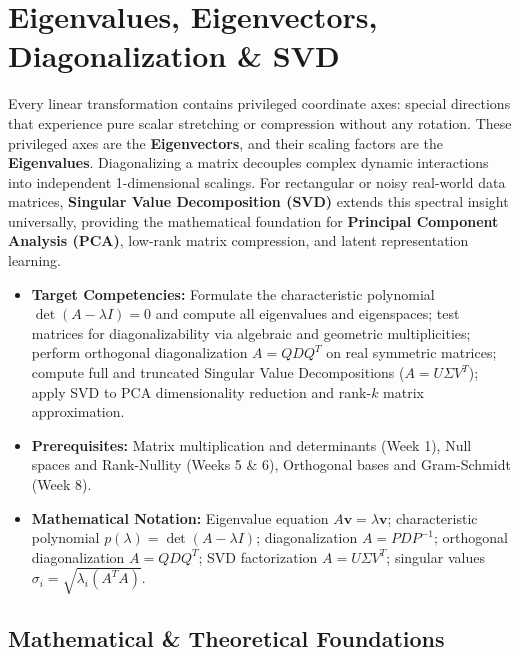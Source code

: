 \chapter{Eigenvalues, Eigenvectors, Diagonalization \& SVD}

Every linear transformation contains privileged coordinate axes: special directions that experience pure scalar stretching or compression without any rotation. These privileged axes are the \textbf{Eigenvectors}, and their scaling factors are the \textbf{Eigenvalues}. Diagonalizing a matrix decouples complex dynamic interactions into independent 1-dimensional scalings. For rectangular or noisy real-world data matrices, \textbf{Singular Value Decomposition (SVD)} extends this spectral insight universally, providing the mathematical foundation for \textbf{Principal Component Analysis (PCA)}, low-rank matrix compression, and latent representation learning.

\vspace{0.5cm}
\begin{tcolorbox}[colback=primarylight, colframe=primarydark, title={\textbf{Executive Roadmap \& Learning Objectives}}]
\begin{itemize}
    \item \textbf{Target Competencies:} Formulate the characteristic polynomial $\det(A - \lambda I) = 0$ and compute all eigenvalues and eigenspaces; test matrices for diagonalizability via algebraic and geometric multiplicities; perform orthogonal diagonalization $A = Q D Q^T$ on real symmetric matrices; compute full and truncated Singular Value Decompositions ($A = U \Sigma V^T$); apply SVD to PCA dimensionality reduction and rank-$k$ matrix approximation.
    \item \textbf{Prerequisites:} Matrix multiplication and determinants (Week 1), Null spaces and Rank-Nullity (Weeks 5 \& 6), Orthogonal bases and Gram-Schmidt (Week 8).
    \item \textbf{Mathematical Notation:} Eigenvalue equation $A\mathbf{v} = \lambda\mathbf{v}$; characteristic polynomial $p(\lambda) = \det(A - \lambda I)$; diagonalization $A = P D P^{-1}$; orthogonal diagonalization $A = Q D Q^T$; SVD factorization $A = U \Sigma V^T$; singular values $\sigma_i = \sqrt{\lambda_i(A^T A)}$.
\end{itemize}
\end{tcolorbox}

\section{Mathematical \& Theoretical Foundations}

